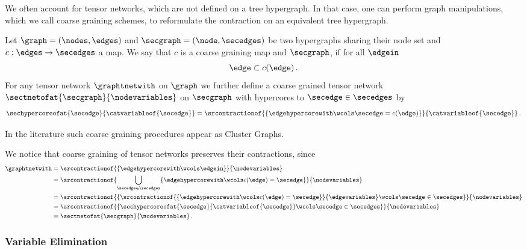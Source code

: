 We often account for tensor networks, which are not defined on a tree hypergraph.
In that case, one can perform graph manipulations, which we call coarse graining schemes, to reformulate the contraction on an equivalent tree hypergraph.

\begin{definition}
    Let $\graph=(\nodes,\edges)$ and $\secgraph=(\node,\secedges)$ be two hypergraphs sharing their node set and $c: \edges \rightarrow \secedges$ a map.
    We say that $c$ is a coarse graining map and $\secgraph$, if for all $\edgein$
    \begin{align*}
        \edge \subset c(\edge) \, .
    \end{align*}
    For any tensor network $\graphtnetwith$ on $\graph$ we further define a coarse grained tensor network $\sectnetofat{\secgraph}{\nodevariables}$ on $\secgraph$ with hypercores to $\secedge\in\secedges$ by
    \begin{align*}
        \sechypercoreofat{\secedge}{\catvariableof{\secedge}}
        = \srcontractionof{\{\edgehypercorewith\wcols\secedge=c(\edge)\}}{\catvariableof{\secedge}} \, .
    \end{align*}
\end{definition}

In the literature such coarse graining procedures appear as Cluster Graphs.

We notice that coarse graining of tensor networks preserves their contractions, since
\begin{align*}
    \graphtnetwith
    &= \srcontractionof{\{\edgehypercorewith\wcols\edgein\}}{\nodevariables} \\
    &= \srcontractionof{\bigcup_{\secedge\in\secedges}\{\edgehypercorewith\wcols c(\edge)=\secedge\}}{\nodevariables} \\
    &= \srcontractionof{\{\srcontractionof{\{\edgehypercorewith\wcols c(\edge)=\secedge\}}{\edgevariables}\wcols\secedge\in\secedges\}}{\nodevariables} \\
    &= \srcontractionof{\{\sechypercoreofat{\secedge}{\catvariableof{\secedge}}\wcols\secedge\in\secedges\}}{\nodevariables} \\
    &= \sectnetofat{\secgraph}{\nodevariables} \, .
\end{align*}


\subsubsection{Variable Elimination}

